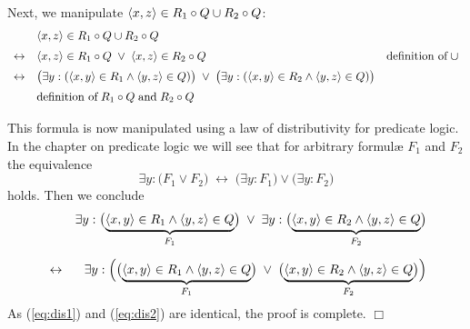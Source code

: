 Next, we manipulate $\pair(x,z) \in R_1 \circ Q \cup R_2 \circ Q$:
\[
\begin{array}{cll}
                & \pair(x,z) \in R_1 \circ Q \cup R_2 \circ Q \\[0.2cm]
\leftrightarrow & \pair(x,z) \in R_1 \circ Q \;\vee\; \pair(x,z) \in R_2 \circ Q &
                  \mbox{definition of}\;\cup \\[0.2cm]
\leftrightarrow & \bigl(\exists y: (\pair(x,y) \in R_1 \wedge \pair(y,z) \in Q)\bigr) \;\vee\; 
                  \bigl(\exists y: (\pair(x,y) \in R_2 \wedge \pair(y,z) \in Q)\bigr) \\[0.2cm]
                & \mbox{definition of}\; R_1 \circ Q \; \mbox{and}\; R_2 \circ Q \\[0.2cm]
\end{array}
\]
This formula is now manipulated using a law of distributivity for predicate logic.
In the chapter on predicate logic we will see that for arbitrary {formul\ae}
 $F_1$ and $F_2$ the equivalence
\[ \exists y: \bigl(F_1 \vee F_2\bigr) \;\leftrightarrow\; \bigl(\exists y: F_1\bigr) \vee \bigl(\exists y: F_2\bigr) \]
holds.  Then we conclude 
\begin{eqnarray}
\nonumber
 & & \exists y: \bigl(\underbrace{\pair(x,y) \in R_1 \wedge \pair(y,z) \in Q}_{F_1}\bigr) \;\vee\; 
     \exists y: \bigl(\underbrace{\pair(x,y) \in R_2 \wedge \pair(y,z) \in Q}_{F_2}\bigr) \\[0.2cm]
  \label{eq:dis2}
 & \leftrightarrow &
     \exists y: \Bigl(\bigl(\underbrace{\pair(x,y) \in R_1 \wedge \pair(y,z) \in Q}_{F_1}\bigr) \;\vee\; 
                \bigl(\underbrace{\pair(x,y) \in R_2 \wedge \pair(y,z) \in Q}_{F_2}\bigr)\Bigr) 
\end{eqnarray}
As (\ref{eq:dis1}) and (\ref{eq:dis2}) are identical, the proof is complete.
\hspace*{\fill} $\Box$
\vspace{0.2cm}

